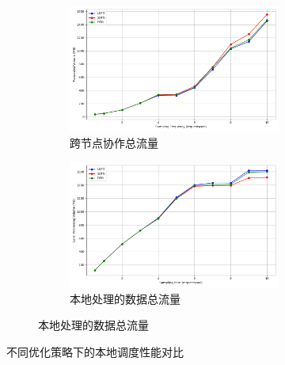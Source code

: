 \begin{figure}[ht]
    \centering
    \begin{subfigure}{\textwidth}
        \centering
        \begin{subfigure}{0.48\textwidth}
            \centering
            \includegraphics[width=\linewidth]{pics/expr/exp3_frequency_forwarded.png}
            \caption{跨节点协作总流量}
            \vspace{0.3cm}
        \end{subfigure}
        \begin{subfigure}{0.48\textwidth}
            \centering
            \includegraphics[width=\linewidth]{pics/expr/exp3_frequency_local_processed.png}
            \caption{本地处理的数据总流量}
            \vspace{0.3cm}
        \end{subfigure}
    \end{subfigure}
    \caption{不同优化策略下的本地调度性能对比}
    \label{fig:exp2}
\end{figure}

